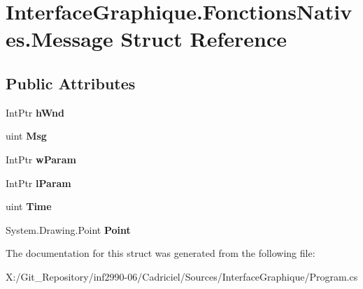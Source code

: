 \hypertarget{struct_interface_graphique_1_1_fonctions_natives_1_1_message}{\section{Interface\-Graphique.\-Fonctions\-Natives.\-Message Struct Reference}
\label{struct_interface_graphique_1_1_fonctions_natives_1_1_message}
}
\subsection*{Public Attributes}
\begin{DoxyCompactItemize}
\item 
\hypertarget{struct_interface_graphique_1_1_fonctions_natives_1_1_message_aa25d996ad709246eecada71a0f375b21}{Int\-Ptr {\bfseries h\-Wnd}}\label{struct_interface_graphique_1_1_fonctions_natives_1_1_message_aa25d996ad709246eecada71a0f375b21}

\item 
\hypertarget{struct_interface_graphique_1_1_fonctions_natives_1_1_message_a1b1dfd72e58f292bbd24d6dc7a0b0f61}{uint {\bfseries Msg}}\label{struct_interface_graphique_1_1_fonctions_natives_1_1_message_a1b1dfd72e58f292bbd24d6dc7a0b0f61}

\item 
\hypertarget{struct_interface_graphique_1_1_fonctions_natives_1_1_message_aa04705defc08a7fea09f90b1cd069e20}{Int\-Ptr {\bfseries w\-Param}}\label{struct_interface_graphique_1_1_fonctions_natives_1_1_message_aa04705defc08a7fea09f90b1cd069e20}

\item 
\hypertarget{struct_interface_graphique_1_1_fonctions_natives_1_1_message_afc019b6c13559ba2a12a64e24eba9baf}{Int\-Ptr {\bfseries l\-Param}}\label{struct_interface_graphique_1_1_fonctions_natives_1_1_message_afc019b6c13559ba2a12a64e24eba9baf}

\item 
\hypertarget{struct_interface_graphique_1_1_fonctions_natives_1_1_message_ae0ab10151482b01c9c5fe1cb4e8a2306}{uint {\bfseries Time}}\label{struct_interface_graphique_1_1_fonctions_natives_1_1_message_ae0ab10151482b01c9c5fe1cb4e8a2306}

\item 
\hypertarget{struct_interface_graphique_1_1_fonctions_natives_1_1_message_a9dc93f6c7f6db4f91386aef27b0a77ad}{System.\-Drawing.\-Point {\bfseries Point}}\label{struct_interface_graphique_1_1_fonctions_natives_1_1_message_a9dc93f6c7f6db4f91386aef27b0a77ad}

\end{DoxyCompactItemize}


The documentation for this struct was generated from the following file\-:\begin{DoxyCompactItemize}
\item 
X\-:/\-Git\-\_\-\-Repository/inf2990-\/06/\-Cadriciel/\-Sources/\-Interface\-Graphique/Program.\-cs\end{DoxyCompactItemize}

